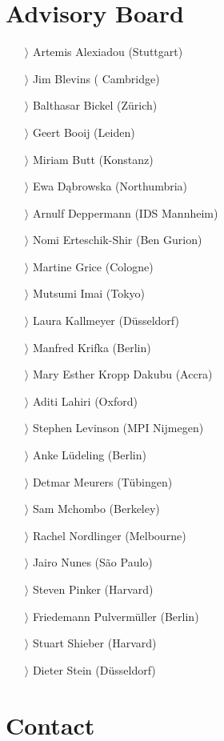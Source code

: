 \documentclass[
notumble,
nofoldmark,
]{leaflet}
\begin{document}
  
 

\newpage 
\color{LIGHTGRAY}
\section{\sffamily\Large Advisory Board}

\begin{itemize}
 \item[$\rangle$] Artemis Alexiadou (Stuttgart)
 \item[$\rangle$] Jim Blevins ( Cambridge)
 \item[$\rangle$] Balthasar Bickel (Z\"urich)
 \item[$\rangle$] Geert Booij (Leiden)
 \item[$\rangle$] Miriam Butt (Konstanz)
 \item[$\rangle$] Ewa D\k{a}browska (Northumbria)
 \item[$\rangle$] Arnulf Deppermann (IDS Mannheim)
 \item[$\rangle$] Nomi Erteschik-Shir (Ben Gurion)
 \item[$\rangle$] Martine Grice (Cologne)
 \item[$\rangle$] Mutsumi Imai (Tokyo)
 \item[$\rangle$] Laura Kallmeyer (D\"usseldorf)
 \item[$\rangle$] Manfred Krifka (Berlin)
 \item[$\rangle$] Mary Esther Kropp Dakubu (Accra)
 \item[$\rangle$] Aditi Lahiri (Oxford)
 \item[$\rangle$] Stephen Levinson (MPI Nijmegen)
 \item[$\rangle$] Anke L\"udeling (Berlin)
 \item[$\rangle$] Detmar Meurers (T\"ubingen)
 \item[$\rangle$] Sam Mchombo (Berkeley)
 \item[$\rangle$] Rachel Nordlinger (Melbourne)
 \item[$\rangle$] Jairo Nunes (S\~ao Paulo)
 \item[$\rangle$] Steven Pinker (Harvard)
 \item[$\rangle$] Friedemann Pulverm\"uller (Berlin)
 \item[$\rangle$] Stuart Shieber (Harvard)
 \item[$\rangle$] Dieter Stein (D\"usseldorf)  
\end{itemize}

\section{\sffamily\Large Contact} 
\end{document}
